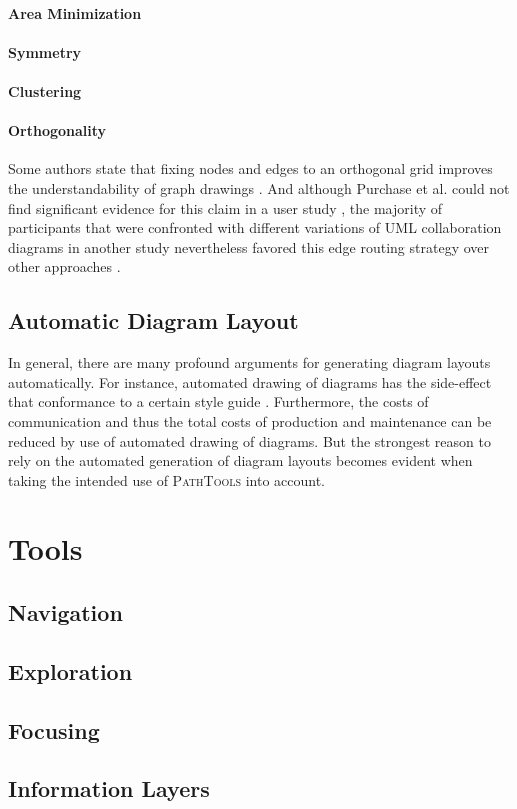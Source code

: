 \paragraph{Area Minimization}

\paragraph{Symmetry}

\paragraph{Clustering}

\paragraph{Orthogonality} Some authors state that fixing nodes and edges to an orthogonal grid improves the understandability of graph drawings \cite{sugiyama_methods_1981, batini_what_1985}.
And although Purchase et al. could not find significant evidence for this claim in a user study \cite{purchase_which_1997}, the majority of participants that were confronted with different variations of UML collaboration diagrams in another study nevertheless favored this edge routing strategy over other approaches \cite{purchase_graph_2004}.

\subsection{Automatic Diagram Layout}
In general, there are many profound arguments for generating diagram layouts automatically.
For instance, automated drawing of diagrams has the side-effect that conformance to a certain style guide .
Furthermore, the costs of communication and thus the total costs of production and maintenance can be reduced by use of automated drawing of diagrams.
But the strongest reason to rely on the automated generation of diagram layouts becomes evident when taking the intended use of \textsc{PathTools} into account.


\section{Tools}
\subsection{Navigation}
\subsection{Exploration}
\subsection{Focusing}
\subsection{Information Layers}